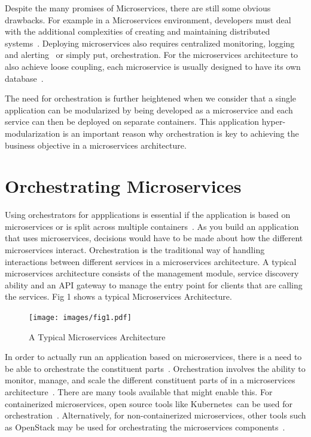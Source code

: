 Despite the many promises of Microservices, there are still some
obvious drawbacks. For example in a Microservices environment,
developers must deal with the additional complexities of creating and
maintaining distributed
systems~\cite{hid-sp18-501-patterns}. Deploying microservices also
requires centralized monitoring, logging and
alerting~\cite{hid-sp18-501-challenges} or simply put,
orchestration. For the microservices architecture to also achieve
loose coupling, each microservice is usually designed to have its own
database~\cite{hid-sp18-501-patterns}.

The need for orchestration is further heightened when we consider that
a single application can be modularized by being developed as a
microservice and each service can then be deployed on separate
containers. This application hyper-modularization is an important
reason why orchestration is key to achieving the business objective in
a microservices architecture.


\section{Orchestrating Microservices}
Using orchestrators for appplications is essential if the application
is based on microservices or is split across multiple
containers~\cite{hid-sp18-501-dotnet}. As you build an application
that uses microservices, decisions would have to be made about how the
different microservices interact. Orchestration is the traditional way
of handling interactions between different services in a microservices
architecture. A typical microservices architecture consists of the
management module, service discovery ability and an API gateway to
manage the entry point for clients that are calling the services.  Fig
1 shows a typical Microservices Architecture.

\begin{figure}[!ht]
  \centering\texttt{[image: images/fig1.pdf]}
  \caption{A Typical Microservices Architecture~\cite{hid-sp18-501-fig1}}
\label{f:architecture}
\end{figure}

In order to actually run an application based on microservices, there
is a need to be able to orchestrate the constituent
parts~\cite{hid-sp18-501-opensource}. Orchestration involves 
the ability to monitor, manage, and
scale the different constituent parts of in a microservices
architecture~\cite{hid-sp18-501-opensource}. There are many tools available 
that might enable this. For
containerized microservices, open source tools like Kubernetes can be
used for orchestration~\cite{hid-sp18-501-onfido}. Alternatively, for
non-containerized microservices, other tools such as OpenStack may be
used for orchestrating the microservices
components~\cite{hid-sp18-501-rackspace}.

